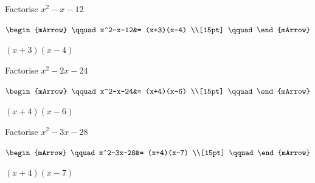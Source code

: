 \begin{mtask}
   \task \begin{exercise} Factorise $x^2-x-12$\\
            \begin{envSolution}[equal height group=hRevF1]
                  $\begin{mArrow}
                       \qquad x^2-x-12&=  (x+3)(x-4) \\[15pt]
	                              \qquad 
					\end{mArrow}$
                 \begin{shortsolution}  
				       $(x+3)(x-4)$
			     \end{shortsolution}				 
               \end{envSolution}
         \end{exercise}

   \task \begin{exercise} Factorise $x^2-2x-24$\\
            \begin{envSolution}[equal height group=hRevF1]
                  $\begin{mArrow}
                       \qquad x^2-x-24&=  (x+4)(x-6) \\[15pt]
	                              \qquad 
					\end{mArrow}$
                 \begin{shortsolution}  
				       $(x+4)(x-6)$
			     \end{shortsolution}				 
               \end{envSolution}
         \end{exercise}

   \task \begin{exercise} Factorise $x^2-3x-28$\\
            \begin{envSolution}[equal height group=hRevF1]
                  $\begin{mArrow}
                       \qquad x^2-3x-28&=  (x+4)(x-7) \\[15pt]
	                              \qquad 
					\end{mArrow}$
                 \begin{shortsolution}  
				       $(x+4)(x-7)$
			     \end{shortsolution}				 
               \end{envSolution}
         \end{exercise}

\end{mtask}		 



